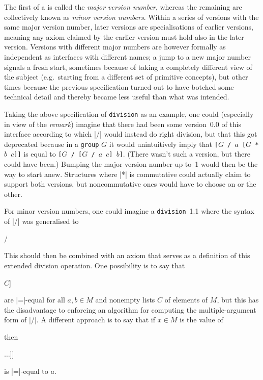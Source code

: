 \documentclass{mtmtcl}
\theoremstyle{plain}
\theoremstyle{remark}
\begin{document}
The first  of a  is called the 
\emph{major version number}, whereas the remaining are collectively 
known as \emph{minor version numbers}. Within a series of versions 
with the same major version number, later versions are 
specialisations of earlier versions, meaning any axiom claimed by the 
earlier version must hold also in the later version. Versions with 
different major numbers are however formally as independent as 
interfaces with different names; a jump to a new major number signals 
a fresh start, sometimes because of taking a completely different 
view of the subject (e.g.~starting from a different set of primitive 
concepts), but other times because the previous specification turned 
out to have botched some technical detail and thereby became less 
useful than what was intended.

Taking the above specification of \texttt{division} as an example, 
one could (especially in view of the \emph{remark}) imagine that there 
had been some version~0.0 of this interface according to which |/| 
would instead do right division, but that this got deprecated because 
in a \texttt{group} $G$ it would unintuitively imply that 
\texttt{[$G$ / $a$ [$G$ * $b$ $c$]]} is equal to 
\texttt{[$G$ / [$G$ / $a$ $c$] $b$]}. (There wasn't such a version, 
but there could have been.) Bumping the major version number up to~1 
would then be the way to start anew. Structures where |*| is 
commutative could actually claim to support both versions, but 
noncommutative ones would have to choose on or the other.

For minor version numbers, one could imagine a \texttt{division}~1.1 
where the syntax of |/| was generalised to
\begin{displaysyntax}
   /  \regplus
\end{displaysyntax}
This should then be combined with an axiom that serves as a 
definition of this extended division operation. One possibility is to 
say that
\begin{displaysyntax}
  [$M$ / $a$ $b$ \splode$C$]\par
  [$M$ / [$M$ / $a$ $b$] \splode$C$]
\end{displaysyntax}
are |=|-equal for all \(a,b \in M\) and nonempty lists $C$ of 
elements of $M$, but this has the disadvantage to enforcing an 
algorithm for computing the multiple-argument form of |/|. A 
different approach is to say that if \(x \in M\) is the value of
\begin{displaysyntax}
  [$M$ / $a$ $b_1$ \dots $b_n$]
\end{displaysyntax}
then
\begin{displaysyntax}
  [$M$ * $b_1$ [$\dots$ [$M$ * $b_n$ $x$]$\dots$]]
\end{displaysyntax}
is |=|-equal to $a$.
\end{document}
